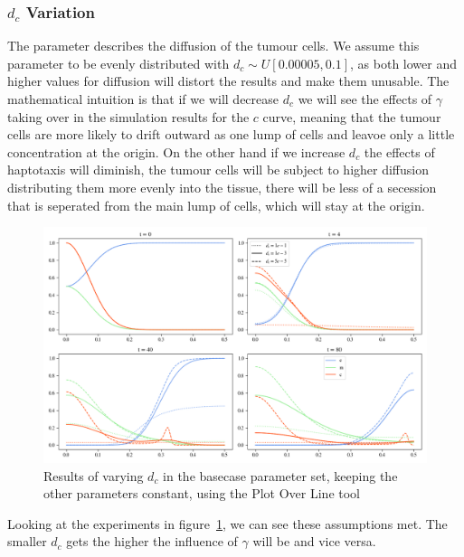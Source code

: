 \subsubsection*{$d_c$ Variation}
The parameter describes the diffusion of the tumour cells. We assume this parameter to be evenly distributed with $d_c \sim U[0.00005,0.1]$, as both lower and higher values for diffusion will distort the results and make them unusable.\newline 
The mathematical intuition is that if we will decrease $d_c$ we will see the effects of $\gamma$ taking over in the simulation results for the $c$ curve, meaning that the tumour cells are more likely to drift outward as one lump of cells and leavoe only a little concentration at the origin. On the other hand if we increase $d_c$ the effects of haptotaxis will diminish, the tumour cells will be subject to higher diffusion distributing them more evenly into the tissue, there will be less of a secession that is seperated from the main lump of cells, which will stay at the origin. 
\begin{figure}[h]
    \centering
    \includegraphics[width=\textwidth]{resources/images/dc_variation.png}
    \caption{Results of varying $d_c$ in the basecase parameter set, keeping the other parameters constant, using the Plot Over Line tool}
    \label{fig:dc_comparison}
\end{figure}
Looking at the experiments in figure~\ref{fig:dc_comparison}, we can see these assumptions met. The smaller $d_c$ gets the higher the influence of $\gamma$ will be and vice versa. 

